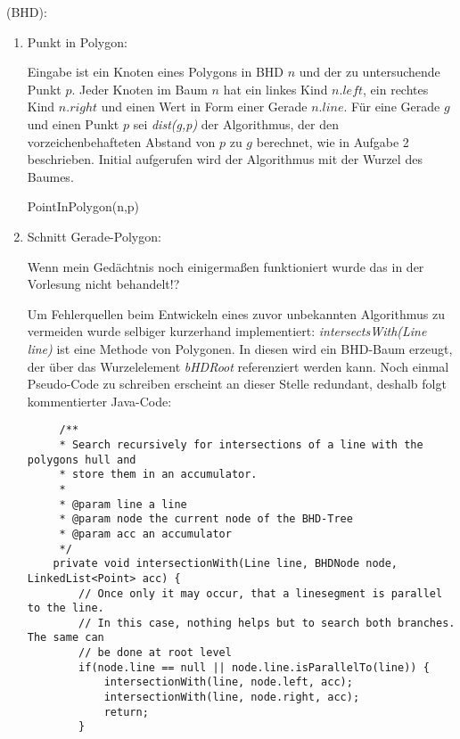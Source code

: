 \documentclass[a4paper, titlepage=false, parskip=full-, 10pt]{scrartcl}
\newcounter{tasknbr}
\newenvironment{task}[1]{{\bf Aufgabe \arabic {tasknbr}\stepcounter{tasknbr}} (#1):\begin{enumerate}}{\end{enumerate}}
\newcommand{\subtask}[1]{\item[#1)]}
\begin{document}
\begin{task}{BHD}
\subtask{a}
Punkt in Polygon:

Eingabe ist ein Knoten eines Polygons in BHD $n$ und der zu untersuchende Punkt $p$. Jeder Knoten im Baum $n$ hat ein linkes Kind $n.left$, ein rechtes Kind $n.right$ und einen Wert in Form einer Gerade $n.line$. Für eine Gerade $g$ und einen Punkt $p$ sei \emph{dist(g,p)} der Algorithmus, der den vorzeichenbehafteten Abstand von $p$ zu $g$ berechnet, wie in Aufgabe 2 beschrieben. Initial aufgerufen wird der Algorithmus mit der Wurzel des Baumes.
\begin{algorithm}
\caption{PointInPolygon(n,p)}
\begin{algorithmic}
\ENDIF
{}
\ENDIF
{}
\ENDIF
{}
\ENDIF
{}
\ENDIF
{}
\ENDIF
{}
\end{algorithmic}
\end{algorithm}

\subtask{b}
Schnitt Gerade-Polygon:

Wenn mein Gedächtnis noch einigermaßen funktioniert wurde das in der Vorlesung nicht behandelt!?

Um Fehlerquellen beim Entwickeln eines zuvor unbekannten Algorithmus zu vermeiden wurde selbiger kurzerhand implementiert: \emph{intersectsWith(Line line)} ist eine Methode von Polygonen. In diesen wird ein BHD-Baum erzeugt, der über das Wurzelelement \emph{bHDRoot} referenziert werden kann. Noch einmal Pseudo-Code zu schreiben erscheint an dieser Stelle redundant, deshalb folgt kommentierter Java-Code:
\lstset{language=Java}
\begin{lstlisting}
     /**
     * Search recursively for intersections of a line with the polygons hull and
     * store them in an accumulator.
     * 
     * @param line a line
     * @param node the current node of the BHD-Tree
     * @param acc an accumulator
     */
    private void intersectionWith(Line line, BHDNode node, LinkedList<Point> acc) {
        // Once only it may occur, that a linesegment is parallel to the line.
        // In this case, nothing helps but to search both branches. The same can
        // be done at root level
        if(node.line == null || node.line.isParallelTo(line)) {
            intersectionWith(line, node.left, acc);
            intersectionWith(line, node.right, acc);
            return;
        }


\end{lstlisting}
\end{task}
\end{document}

